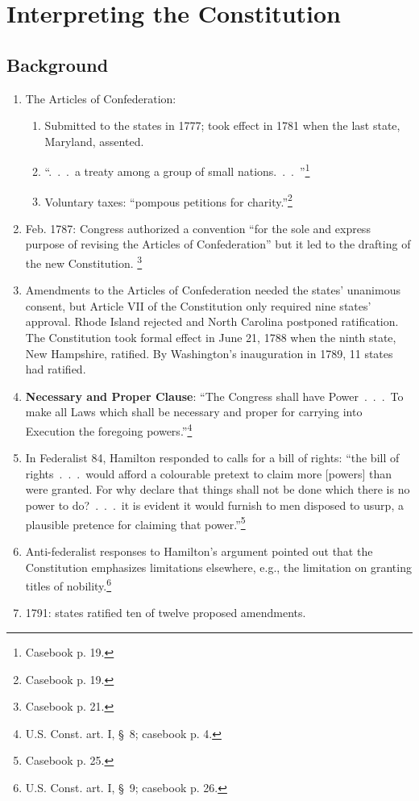 \section{Interpreting the Constitution}

\subsection{Background}

\begin{enumerate}
    \item The Articles of Confederation:
    \begin{enumerate}
        \item Submitted to the states in 1777; took effect in 1781 when the 
        last state, Maryland, assented.
        \item ``.~.~.~a treaty among a group of small nations.~.~.~''\footnote{Casebook p. 
        19.}
        \item Voluntary taxes: ``pompous petitions for 
        charity.''\footnote{Casebook p. 19.}
    \end{enumerate}
    \item Feb. 1787: Congress authorized a convention ``for the sole and 
    express purpose of revising the Articles of 
    Confederation'' but it led to the drafting of the new Constitution. 
    \footnote{Casebook p. 21.}
    \item Amendments to the Articles of Confederation needed the states' 
    unanimous consent, but Article VII of the Constitution only required nine 
    states' approval. Rhode Island rejected and North Carolina postponed 
    ratification. The Constitution took formal effect in June 21, 1788 when 
    the ninth state, New Hampshire, ratified. By Washington's inauguration in 
    1789, 11 states had ratified.
    \item \textbf{Necessary and Proper Clause}: ``The Congress shall have 
    Power~.~.~.~To make all Laws which shall be necessary and proper for carrying 
    into Execution the foregoing powers.''\footnote{U.S. Const. art. I, \S\ 8; 
    casebook p. 4.}
    \item In Federalist 84, Hamilton responded to calls for a bill of rights: 
    ``the bill of rights~.~.~.~would afford a colourable pretext to claim more 
    [powers] than were granted. For why declare that things shall not be done 
    which there is no power to do?~.~.~.~it is evident it would furnish to men 
    disposed to usurp, a plausible pretence for claiming that 
    power.''\footnote{Casebook p. 25.}
    \item Anti-federalist responses to Hamilton's argument pointed out that 
    the Constitution emphasizes limitations elsewhere, e.g., the limitation on 
    granting titles of nobility.\footnote{U.S. Const. art. I, \S\ 9; casebook 
    p. 26.}
    \item 1791: states ratified ten of twelve proposed amendments.
\end{enumerate}

